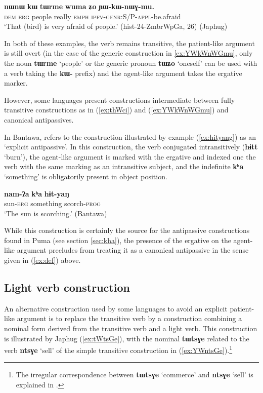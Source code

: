 \documentclass[oneside,a4paper,11pt]{article}
\newcommand{\ipa}[1]{{\phon\textbf{#1}}}
\begin{document}
\begin{exe}
\ex  \label{ex:YWkWnWGmu}
\gll
\ipa{nɯnɯ} 	\ipa{kɯ} 	\ipa{tɯrme} 	\ipa{wuma} 	\ipa{ʑo} 	\ipa{ɲɯ-kɯ-nɯɣ-mu.} \\
\textsc{dem} \textsc{erg} people really \textsc{emph} \textsc{ipfv-genr:S/P-appl}-be.afraid \\
\glt `That (bird) is very afraid of people.' (hist-24-ZmbrWpGa, 26) (Japhug)
\end{exe}

In both of these examples, the verb remains transitive, the patient-like argument is still overt (in the case of the generic construction in \ref{ex:YWkWnWGmu}, only the noun \ipa{tɯrme} `people' or the generic pronoun \ipa{tɯʑo} `oneself' can be used with a verb taking the \ipa{kɯ-} prefix)  and the agent-like argument takes the ergative marker.

However, some languages present constructions intermediate between fully transitive constructions as in (\ref{ex:thWci}) and (\ref{ex:YWkWnWGmu}) and canonical antipassives. 

In Bantawa, \citet[226;335]{doornenbal09} refers to the construction illustrated by example (\ref{ex:hityang}) as an `explicit antipassive'. In this construction, the verb conjugated intransitively (\ipa{hɨtt} `burn'), the agent-like argument is marked with the ergative and indexed one the verb with the same marking as an intransitive subject, and the indefinite \ipa{kʰa} `something' is obligatorily present in object position.

\begin{exe}
\ex \label{ex:hityang}
\gll 
\ipa{nam-ʔa} \ipa{kʰa} \ipa{hɨt-yaŋ} \\
sun-\textsc{erg} something scorch-\textsc{prog} \\
\glt ‘The sun is scorching.’ (Bantawa)
\end{exe}

While this construction is certainly the source for the antipassive constructions found in Puma (see section \ref{sec:kha}), the presence of the ergative on the agent-like argument precludes from treating it as a canonical antipassive in the sense given in (\ref{ex:def}) above.

\subsection{Light verb construction} \label{sec:light}
An alternative construction used by some languages to avoid an explicit patient-like argument is to replace the transitive verb by a construction combining a nominal form derived from the transitive verb and a light verb. This construction is illustrated by Japhug (\ref{ex:tWtsGe}), with the nominal \ipa{tɯtsɣe} related to the verb \ipa{ntsɣe} `sell' of the simple transitive construction in (\ref{ex:YWntsGe}).\footnote{The irregular correspondence between \ipa{tɯtsɣe} `commerce' and \ipa{ntsɣe} `sell' is explained in \citet{jacques14antipassive}. }
\end{document}

